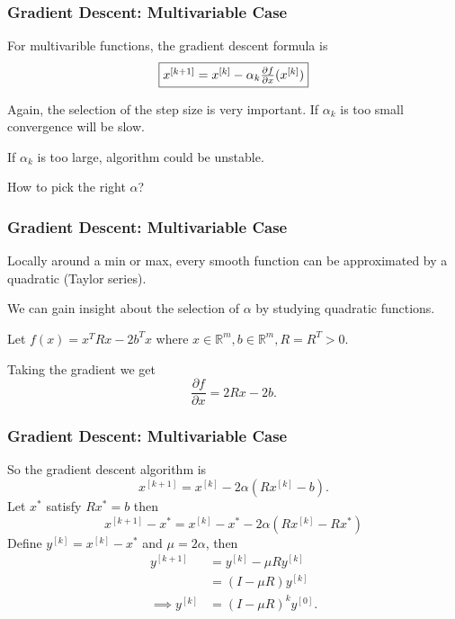 \documentclass{beamer}
\begin{document}
\begin{frame}\frametitle{Gradient Descent: Multivariable Case}
	For multivarible functions, the gradient descent formula is
	\[ 
		\fbox{$x^{[k+1]} = x^{[k]} - \alpha_k \frac{\partial f}{\partial x}(x^{[k]})$}
	\]
	
	Again, the selection of the step size is very important.  If $\alpha_k$ is too small convergence will be slow.
	
	\vfill
	
	If $\alpha_k$ is too large, algorithm could be unstable.	
	
	\vfill
	
	How to pick the right $\alpha$?
	
\end{frame}

\begin{frame}\frametitle{Gradient Descent: Multivariable Case}
	Locally around a min or max, every smooth function can be approximated by a quadratic (Taylor series).  
	
	\vfill
	
	We can gain insight about the selection of $\alpha$ by studying quadratic functions.
	
	\vfill
	
	Let $f(x) = x^TRx - 2b^Tx$ where $x \in \mathbb{R}^m,b\in\mathbb{R}^m,R=R^T>0$.	
	
	\vfill
	
	Taking the gradient we get
	\[ 
		\frac{\partial f}{\partial x} = 2Rx - 2b.
	\]
\end{frame}

\begin{frame}\frametitle{Gradient Descent: Multivariable Case}
	So the gradient descent algorithm is
	\[ 
		x^{[k+1]} = x^{[k]} - 2\alpha(Rx^{[k]} - b). 
	\]
	Let $x^{\ast}$ satisfy $Rx^{\ast}=b$ then
	\[ 
		x^{[k+1]} - x^{\ast} = x^{[k]} - x^{\ast} - 2\alpha(Rx^{[k]} - Rx^{\ast}) 
	\]
	Define $y^{[k]} = x^{[k]} - x^{\ast}$ and $\mu = 2\alpha$, then 
	\begin{align*}
		y^{[k+1]} 
			&= y^{[k]} - \mu R y^{[k]} \\
			&= (I - \mu R)y^{[k]}\\
		\implies y^{[k]} &= (I - \mu R)^ky^{[0]}.
	\end{align*}	
\end{frame}
\end{document}
